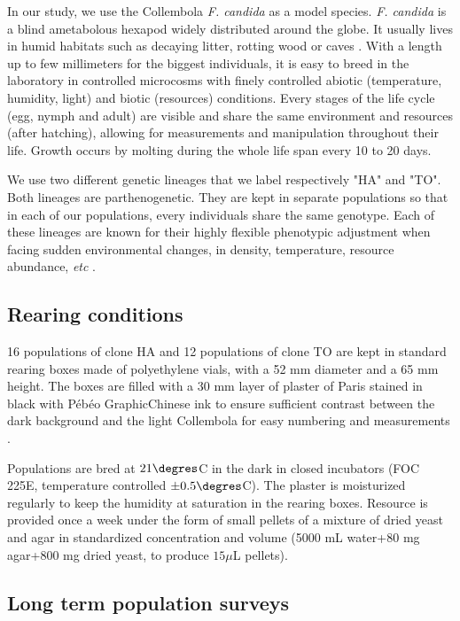 In our study, we use the Collembola \textit{F. candida} as a model
species.
\textit{F.
candida} is a blind ametabolous hexapod widely distributed around the globe. It
usually lives in humid habitats such as decaying litter, rotting wood or caves
\autocites{fountain2005a}. With a length up to few millimeters for the biggest
individuals, it is easy to breed in the laboratory in controlled microcosms with
finely controlled abiotic (temperature, humidity, light) and biotic (resources)
conditions. Every stages of the life cycle (egg, nymph and adult) are visible
and share the same environment and resources (after hatching), allowing for
measurements and manipulation throughout their life. Growth occurs by molting
during the whole life span every 10 to 20 days.

We use two different genetic lineages that we label respectively "HA" and "TO".
Both lineages are parthenogenetic. They are kept in separate populations so that
in each of our populations, every individuals share the same genotype. Each of
these lineages are known for their highly flexible phenotypic adjustment when
facing sudden environmental changes, in density, temperature, resource
abundance, \textit{etc} \autocites{tully2008a,mallard2013b}.

\subsection{Rearing conditions}

16 populations of clone HA and 12 populations of clone TO are kept in standard
rearing boxes made of polyethylene vials, with a 52 mm diameter and a 65 mm
height. The boxes are filled with a 30 mm layer of plaster of Paris stained in
black with Pébéo Graphic\circledR Chinese ink to ensure sufficient contrast between the
dark background and the light Collembola for easy numbering and measurements
\autocites{tully2008a,mallard2013a}.

Populations are bred at $21\degres$C in the dark in closed incubators (FOC 225E,
temperature controlled $\pm 0.5\degres$C). The plaster is moisturized regularly
to keep the humidity at saturation in the rearing boxes. Resource is provided once a week
under the form of small pellets of a mixture of dried yeast and agar in
standardized concentration and volume (5000 mL water+80 mg agar+800 mg dried
yeast, to produce $15 \mu$L pellets).

\subsection{Long term population surveys}

